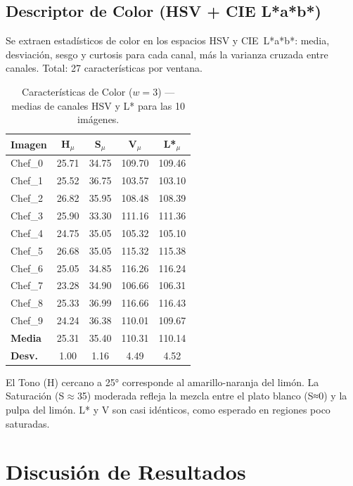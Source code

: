 \documentclass[12pt,a4paper]{article}
\begin{document}
\subsection{Descriptor de Color (HSV + CIE L*a*b*)}

Se extraen estadísticos de color en los espacios HSV y CIE~L*a*b*:
media, desviación, sesgo y curtosis para cada canal, más la varianza
cruzada entre canales.  Total: 27 características por ventana.

\begin{table}[H]
\centering
\caption{Características de Color ($w=3$) — medias de canales HSV y L* para las 10 imágenes.}
\label{tab:color_w3}
\setlength{\tabcolsep}{5pt}
\begin{tabular}{@{}lcccc@{}}
\toprule
\textbf{Imagen} & \textbf{H$_\mu$} & \textbf{S$_\mu$} & \textbf{V$_\mu$} & \textbf{L*$_\mu$} \\
\midrule
Chef\_0 & 25.71 & 34.75 & 109.70 & 109.46 \\
Chef\_1 & 25.52 & 36.75 & 103.57 & 103.10 \\
Chef\_2 & 26.82 & 35.95 & 108.48 & 108.39 \\
Chef\_3 & 25.90 & 33.30 & 111.16 & 111.36 \\
Chef\_4 & 24.75 & 35.05 & 105.32 & 105.10 \\
Chef\_5 & 26.68 & 35.05 & 115.32 & 115.38 \\
Chef\_6 & 25.05 & 34.85 & 116.26 & 116.24 \\
Chef\_7 & 23.28 & 34.90 & 106.66 & 106.31 \\
Chef\_8 & 25.33 & 36.99 & 116.66 & 116.43 \\
Chef\_9 & 24.24 & 36.38 & 110.01 & 109.67 \\
\midrule
\textbf{Media} & 25.31 & 35.40 & 110.31 & 110.14 \\
\textbf{Desv.} &  1.00 &  1.16 &   4.49 &   4.52 \\
\bottomrule
\end{tabular}
\end{table}

\noindent El Tono (H) cercano a 25° corresponde al amarillo-naranja
del limón.  La Saturación (S$\approx$35) moderada refleja la mezcla
entre el plato blanco (S≈0) y la pulpa del limón.  L* y V son
casi idénticos, como esperado en regiones poco saturadas.

\section{Discusión de Resultados}
\end{document}
